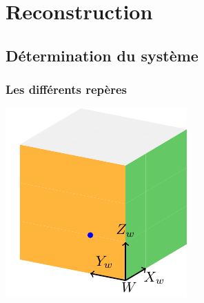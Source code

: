 \section[Reconstruction]{Reconstruction}
\subsection{Détermination du système}

\begin{frame}
\frametitle{Les différents repères}

\begin{minipage}{0.48\textwidth}
    \centering
    \includegraphics[width=\linewidth]{capture/cube_tikz.pdf}
    \vspace{0.5em}
    

\end{minipage}
\end{frame}

